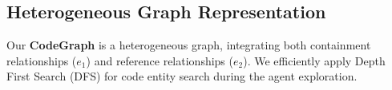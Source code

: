 \subsection{Heterogeneous Graph Representation}
Our \textbf{CodeGraph} is a heterogeneous graph, integrating both containment relationships (\( e_1 \)) and reference relationships (\( e_2 \)). We efficiently apply Depth First Search (DFS) for code entity search during the agent exploration. 




